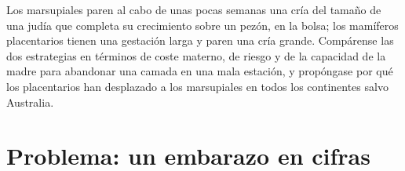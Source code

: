 \begin{exercise}[$\star\star\star$]\label{exo:b2:mammal-reproduction:12}
Los marsupiales paren al cabo de unas pocas semanas una cría del tamaño
de una judía que completa su crecimiento sobre un pezón, en la bolsa; los
mamíferos placentarios tienen una gestación larga y paren una cría
grande. Compárense las dos estrategias en términos de coste materno, de
riesgo y de la capacidad de la madre para abandonar una camada en una
mala estación, y propóngase por qué los placentarios han desplazado a los
marsupiales en todos los continentes salvo Australia.
\end{exercise}

\section{Problema: un embarazo en cifras}

